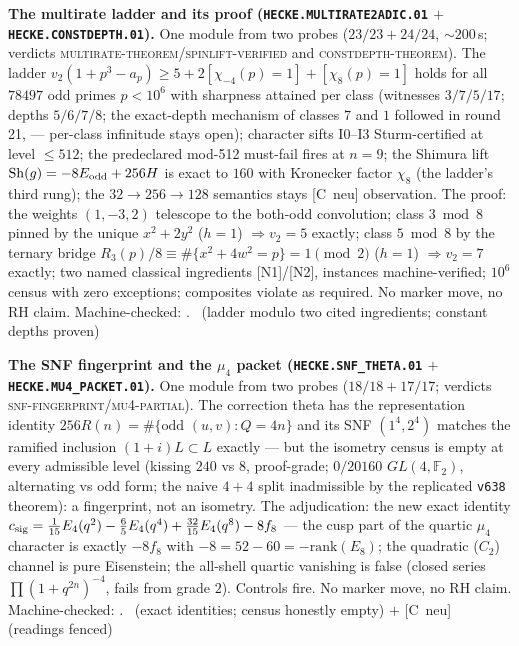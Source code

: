 \par\smallskip\noindent\textbf{The multirate ladder and its proof
(\texttt{HECKE.MULTIRATE2ADIC.01} $+$
\texttt{HECKE.CONSTDEPTH.01}).}
One module from two probes ($23/23+24/24$, ${\sim}200$\,s; verdicts
\textsc{multirate-theorem}/\textsc{spinlift-verified} and
\textsc{constdepth-theorem}).  The ladder
$v_2(1{+}p^3{-}a_p)\ge5+2[\chi_{-4}(p){=}1]+[\chi_8(p){=}1]$ holds
for all $78497$ odd primes $p<10^6$ with sharpness attained per
class (witnesses $3/7/5/17$; depths $5/6/7/8$; the exact-depth
mechanism of classes $7$ and $1$ followed in round 21,
 --- per-class infinitude stays
open); character sifts
I0--I3 Sturm-certified at level $\le512$; the predeclared mod-512
must-fail fires at $n=9$; the Shimura lift
$\mathrm{Sh}(g)=-8E_{\rm odd}+256H$ is exact to $160$ with
Kronecker factor $\chi_8$ (the ladder's third rung); the
$32\to256\to128$ semantics stays [C~neu] observation.  The proof:
the weights $(1,-3,2)$ telescope to the both-odd convolution;
class $3\bmod8$ pinned by the unique $x^2+2y^2$ ($h=1$)
$\Rightarrow v_2=5$ exactly; class $5\bmod8$ by the ternary bridge
$R_3(p)/8\equiv\#\{x^2+4w^2=p\}=1\pmod2$ ($h=1$)
$\Rightarrow v_2=7$ exactly; two named classical ingredients
[N1]/[N2], instances machine-verified; $10^6$ census with zero
exceptions; composites violate as required.  No marker move, no RH
claim.
Machine-checked: .
\mE\ (ladder modulo two cited ingredients; constant depths proven)
\par\smallskip



\par\smallskip\noindent\textbf{The SNF fingerprint and the $\mu_4$
packet (\texttt{HECKE.SNF\_THETA.01} $+$
\texttt{HECKE.MU4\_PACKET.01}).}
One module from two probes ($18/18+17/17$; verdicts
\textsc{snf-fingerprint}/\textsc{mu4-partial}).  The correction
theta has the representation identity
$256R(n)=\#\{\text{odd }(u,v):Q=4n\}$ and its SNF $(1^4,2^4)$
matches the ramified inclusion $(1{+}i)L\subset L$ exactly --- but
the isometry census is empty at every admissible level (kissing
$240$ vs $8$, proof-grade; $0/20160$ $GL(4,\mathbb F_2)$,
alternating vs odd form; the naive $4{+}4$ split inadmissible by
the replicated \texttt{v638} theorem): a fingerprint, not an
isometry.  The adjudication: the new exact identity
$c_{\rm sig}=\tfrac1{15}E_4(q^2)-\tfrac65E_4(q^4)
+\tfrac{32}{15}E_4(q^8)-8f_8$ --- the cusp part of the quartic
$\mu_4$ character is exactly $-8f_8$ with $-8=52-60=
-\mathrm{rank}(E_8)$; the quadratic ($C_2$) channel is pure
Eisenstein; the all-shell quartic vanishing is false (closed
series $\prod(1{+}q^{2n})^{-4}$, fails from grade $2$).  Controls
fire.  No marker move, no RH claim.
Machine-checked: .
\mE\ (exact identities; census honestly empty) $+$ [C~neu]
(readings fenced)
\par\smallskip



